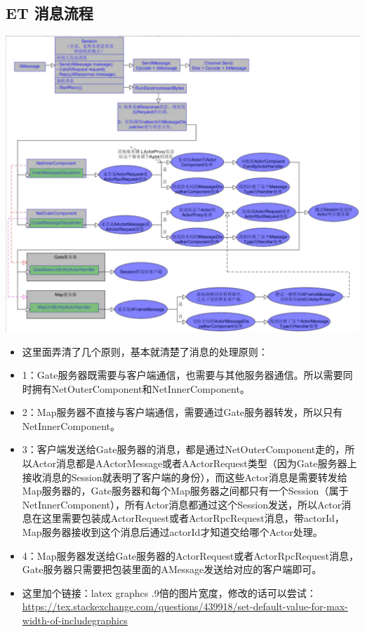 \documentclass[9pt, b5paper]{article}
\begin{document}
\subsection{ET 消息流程}
\label{sec-22-2}

\includegraphics[width=.9\linewidth]{./pic/readme_20230127_113503.png}
\begin{itemize}
\item 这里面弄清了几个原则，基本就清楚了消息的处理原则：
\item 1：Gate服务器既需要与客户端通信，也需要与其他服务器通信。所以需要同时拥有NetOuterComponent和NetInnerComponent。
\item 2：Map服务器不直接与客户端通信，需要通过Gate服务器转发，所以只有NetInnerComponent。
\item 3：客户端发送给Gate服务器的消息，都是通过NetOuterComponent走的，所以Actor消息都是AActorMessage或者AActorRequest类型（因为Gate服务器上接收消息的Session就表明了客户端的身份），而这些Actor消息是需要转发给Map服务器的，Gate服务器和每个Map服务器之间都只有一个Session（属于NetInnerComponent），所有Actor消息都通过这个Session发送，所以Actor消息在这里需要包装成ActorRequest或者ActorRpcRequest消息，带actorId，Map服务器接收到这个消息后通过actorId才知道交给哪个Actor处理。
\item 4：Map服务器发送给Gate服务器的ActorRequest或者ActorRpcRequest消息，Gate服务器只需要把包装里面的AMessage发送给对应的客户端即可。
\item 这里加个链接：latex graphcs .9倍的图片宽度，修改的话可以尝试：\url{https://tex.stackexchange.com/questions/439918/set-default-value-for-max-width-of-includegraphics}
\end{itemize}
\end{document}
